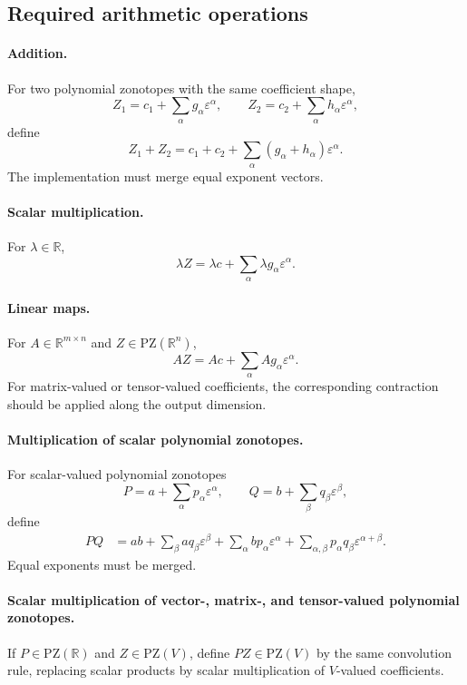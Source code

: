 \documentclass[11pt]{article}
\newcommand{\R}{\mathbb{R}}
\newcommand{\PZ}{\mathrm{PZ}}
\newcommand{\eps}{\varepsilon}
\begin{document}
\subsection{Required arithmetic operations}

\paragraph{Addition.}
For two polynomial zonotopes with the same coefficient shape,
\[
    Z_1=c_1+\sum_\alpha g_\alpha\eps^\alpha,
    \qquad
    Z_2=c_2+\sum_\alpha h_\alpha\eps^\alpha,
\]
define
\[
    Z_1+Z_2
    =
    c_1+c_2+\sum_\alpha(g_\alpha+h_\alpha)\eps^\alpha.
\]
The implementation must merge equal exponent vectors.

\paragraph{Scalar multiplication.}
For \(\lambda\in\R\),
\[
    \lambda Z
    =
    \lambda c+\sum_\alpha \lambda g_\alpha\eps^\alpha.
\]

\paragraph{Linear maps.}
For \(A\in\R^{m\times n}\) and \(Z\in\PZ(\R^n)\),
\[
    AZ
    =
    Ac+\sum_\alpha A g_\alpha\eps^\alpha.
\]
For matrix-valued or tensor-valued coefficients, the corresponding contraction should be applied along the output dimension.

\paragraph{Multiplication of scalar polynomial zonotopes.}
For scalar-valued polynomial zonotopes
\[
    P=a+\sum_\alpha p_\alpha\eps^\alpha,
    \qquad
    Q=b+\sum_\beta q_\beta\eps^\beta,
\]
define
\[
\begin{aligned}
    PQ
    &=
    ab
    +
    \sum_\beta a q_\beta\eps^\beta
    +
    \sum_\alpha b p_\alpha\eps^\alpha
    +
    \sum_{\alpha,\beta}p_\alpha q_\beta\eps^{\alpha+\beta}.
\end{aligned}
\]
Equal exponents must be merged.

\paragraph{Scalar multiplication of vector-, matrix-, and tensor-valued polynomial zonotopes.}
If \(P\in\PZ(\R)\) and \(Z\in\PZ(V)\), define \(PZ\in\PZ(V)\) by the same convolution rule, replacing scalar products by scalar multiplication of \(V\)-valued coefficients.
\end{document}

